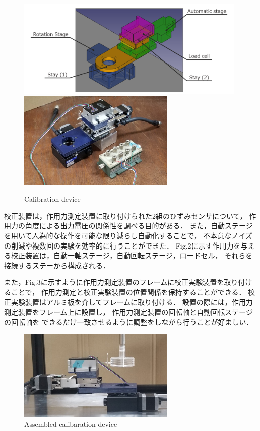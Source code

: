 \begin{figure}[htbp]
    \begin{center}
        \includegraphics[width=110mm]{images/22-1.png}
        \includegraphics[width=75mm]{images/22-2.png}
    \end{center}
    \caption{Calibration device}
\end{figure}

\newpage

校正装置は，作用力測定装置に取り付けられた2組のひずみセンサについて，
作用力の角度による出力電圧の関係性を調べる目的がある．
また，自動ステージを用いて人為的な操作を可能な限り減らし自動化することで，
不本意なノイズの削減や複数回の実験を効率的に行うことができた．
Fig.2に示す作用力を与える校正装置は，自動一軸ステージ，自動回転ステージ，ロードセル，
それらを接続するステーから構成される．

また，Fig.3に示すように作用力測定装置のフレームに校正実験装置を取り付けることで，
作用力測定と校正実験装置の位置関係を保持することができる．
校正実験装置はアルミ板を介してフレームに取り付ける．
設置の際には，作用力測定装置をフレーム上に設置し，
作用力測定装置の回転軸と自動回転ステージの回転軸を
できるだけ一致させるように調整をしながら行うことが好ましい．
\begin{figure}[htbp]
    \footnotesize
    \begin{center}
        \includegraphics[width=75mm]{images/22-3.png}
        \caption{Assembled calibaration device}
    \end{center}
\end{figure}

